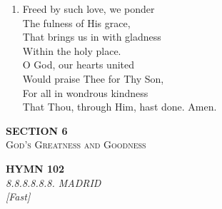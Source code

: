 \documentclass[11pt,a4paper]{article}
\begin{document}
\begin{enumerate}
    \item Freed by such love, we ponder \\
        The fulness of His grace, \\
        That brings us in with gladness \\
        Within the holy place. \\
        O God, our hearts united \\
        Would praise Thee for Thy Son, \\
        For all in wondrous kindness \\
        That Thou, through Him, hast done. Amen.

\end{enumerate}
\newpage
\thispagestyle{empty}
\vspace*{3.5cm}
\begin{center}
    {\LARGE \textbf{SECTION 6}}\\[0.8em]
    {\Large \textsc{God's Greatness and Goodness}}
\end{center}
\vspace{3.5cm}

\newpage
\begin{center}
    {\Large \textbf{HYMN 102}}
    \\
    \textit{8.8.8.8.8.8. MADRID}
    \\
    \textit{\small [Fast]}
\end{center}
\vspace{1em}
\end{document}
